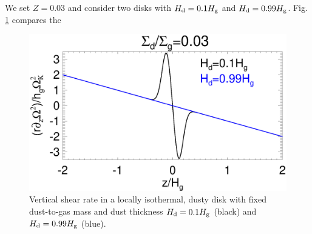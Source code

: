 
We set $Z=0.03$ and consider two disks with $H_\mathrm{d}=0.1H_\mathrm{g}$ and
$H_\mathrm{d}=0.99H_\mathrm{g}$. Fig. \ref{compare_vshear_fixZ} compares the 

\begin{figure}
  \includegraphics[width=\linewidth]{figures/compare_vshear_fixZ} 
  \caption{Vertical shear rate in a locally isothermal, dusty disk
    with fixed dust-to-gas mass and dust thickness $H_\mathrm{d}=0.1H_\mathrm{g}$
    (black) and $H_\mathrm{d}=0.99H_\mathrm{g}$ (blue). 
    \label{compare_vshear_fixZ}
    }
\end{figure}



